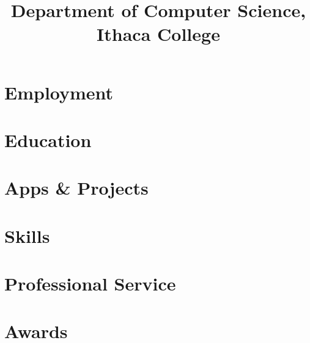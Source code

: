 \documentclass[letterpaper]{practical-resume}
\title{Department of Computer Science,\\Ithaca College}
\begin{document}
\makecvtitle

\section{Employment}


\section{Education}


\section{Apps \& Projects}


\section{Skills}


\printbibliography[title=Select Publications]

\section{Professional Service}


\section{Awards}

\end{document}
